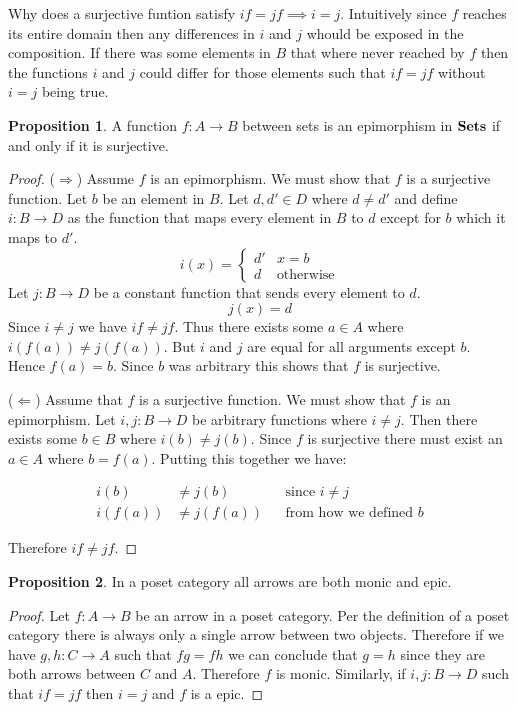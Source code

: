 \documentclass{book}
\theoremstyle{definition}
\newtheorem{proposition}{Proposition}
\newcommand{\arr}[3]{#1 : #2 \rightarrow #3}
\begin{document}
Why does a surjective funtion satisfy $if = jf \implies i = j$. Intuitively
since $f$ reaches its entire domain then any differences in $i$ and $j$ whould
be exposed in the composition. If there was some elements in $B$ that where
never reached by $f$ then the functions $i$ and $j$ could differ for those
elements such that $if = jf$ without $i = j$ being true.

\begin{proposition}
  A function $\arr{f}{A}{B}$ between sets is an epimorphism in $\bf{Sets}$ if
  and only if it is surjective.
\end{proposition}
\begin{proof}
  ($\Rightarrow$) Assume $f$ is an epimorphism. We must show that $f$ is a
  surjective function. Let $b$ be an element in $B$. Let $d, d' \in D$ where $d
  \neq d'$ and define $\arr{i}{B}{D}$ as the function that maps every element
  in $B$ to $d$ except for $b$ which it maps to $d'$.
  \[
    i(x) = \begin{cases}
      d' & x = b \\
      d & \text{otherwise}
    \end{cases}
  \]
  Let $\arr{j}{B}{D}$ be a constant function that sends every element to $d$.
  \[
    j(x) = d
  \]
  Since $i \neq j$ we have $if \neq jf$. Thus there exists some $a \in A$ where
  $i(f(a)) \neq j(f(a))$. But $i$ and $j$ are equal for all arguments except
  $b$. Hence $f(a) = b$. Since $b$ was arbitrary this shows that $f$ is
  surjective.

  ($\Leftarrow$) Assume that $f$ is a surjective function. We must show that $f$
  is an epimorphism. Let $\arr{i, j}{B}{D}$ be arbitrary functions where $i \neq
  j$. Then there exists some $b \in B$ where $i(b) \neq j(b)$. Since $f$ is
  surjective there must exist an $a \in A$ where $b = f(a)$. Putting this
  together we have:

  \begin{align*}
    i(b) &\neq j(b) && \text{since $i \neq j$} \\
    i(f(a)) &\neq j(f(a)) && \text{from how we defined $b$}
  \end{align*}

  Therefore $if \neq jf$.
\end{proof}

\begin{proposition}
  In a poset category all arrows are both monic and epic.
\end{proposition}
\begin{proof}
  Let $\arr{f}{A}{B}$ be an arrow in a poset category. Per the definition of a
  poset category there is always only a single arrow between two objects.
  Therefore if we have $\arr{g, h}{C}{A}$ such that $fg = fh$ we can conclude
  that $g = h$ since they are both arrows between $C$ and $A$. Therefore $f$ is
  monic. Similarly, if $\arr{i, j}{B}{D}$ such that $if = jf$ then $i = j$ and
  $f$ is a epic.
\end{proof}
\end{document}
